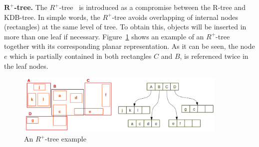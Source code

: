 \documentclass[a4paper,12pt]{article}
\begin{document}
\textbf{$\boldsymbol{R^+}$-tree.}
The $R^+$-tree~\cite{Sellis:rplustree} is introduced as a compromise between the R-tree and KDB-tree. In simple words, the $R^+$-tree avoids overlapping of internal nodes (rectangles) at the same level of tree. To obtain this, objects will be inserted in more than one leaf if necessary. Figure~\ref{r+tree} shows an example of an $R^+$-tree together with its corresponding planar representation. As it can be seen, the node $e$ which is partially contained in both rectangles $C$ and $B$, is referenced twice in the leaf nodes.


\begin{figure}
\centering
\includegraphics[width=0.9\textwidth]{r+tree}
\caption{An {$R^+$-tree} example}
\label{r+tree}
\end{figure}
\end{document}
